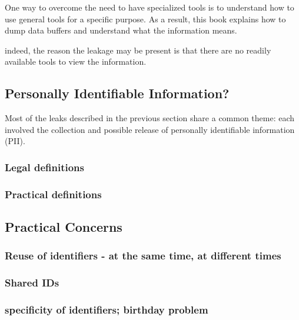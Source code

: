 

One way to overcome the need to have specialized tools is to
understand how to use general tools for a specific purpose. As a
result, this book explains how to dump data buffers and
understand what the information means.


indeed, the reason the
leakage may be present is that there are no readily available tools to
view the information.



\subsection{Personally Identifiable Information?}
Most of the leaks described in the previous section share a common
theme: each involved the collection and possible release of personally
identifiable information (PII).


\subsubsection{Legal definitions}


\subsubsection{Practical definitions}


\subsection{Practical Concerns}


\subsubsection{Reuse of identifiers - at the same time, at different times}
\subsubsection{Shared IDs}
\subsubsection{specificity of identifiers; birthday problem}
